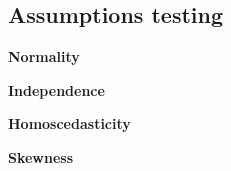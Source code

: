 \subsection{Assumptions testing}


\textbf{Normality}

\textbf{Independence}

\textbf{Homoscedasticity}

\textbf{Skewness}

